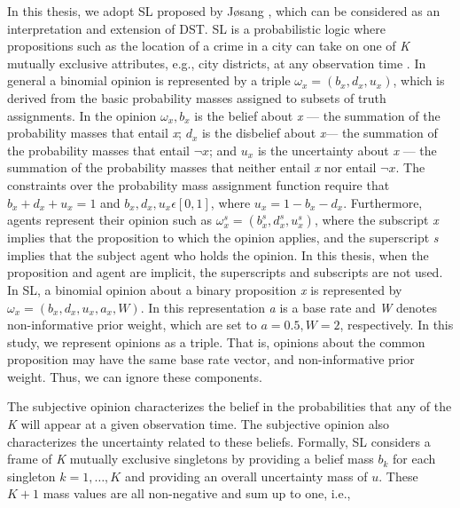 \documentclass[a4,12pt]{ozu-thesis}
\begin{document}
In this thesis, we adopt SL proposed by Jøsang \cite{josang2011subjective}, which can be considered as an interpretation and extension of DST. SL is a probabilistic logic where propositions such as the location of a crime in a city can take on one of \textit{K} mutually exclusive attributes, e.g., city districts, at any observation time \cite{josang2001logic, josang2011subjective}. In general a binomial opinion is represented by a triple $\omega _{x} = \left ( b_{x}, d_{x}, u_{x}\right )$, which is derived from the basic probability masses assigned to subsets of truth assignments. In the opinion $\omega _{x}, b_{x}$ is the belief about \textit{x} — the summation of the probability masses that entail \textit{x}; $ d_{x}$ is the disbelief about \textit{x}— the summation of the probability masses that entail $\neg x$; and $u_{x}$ is the uncertainty about \textit{x} — the summation of the probability masses that neither entail \textit{x} nor entail $\neg x$. The constraints over the probability mass assignment function require that $b_{x} + d_{x} + u_{x} = 1$ and $b_{x}, d_{x}, u_{x} \epsilon \left [ 0, 1 \right ]$, where $u_{x} = 1 - b_{x} - d_{x}$.  Furthermore, agents represent their opinion such as $\omega _{x}^{s} = \left ( b_{x}^{s}, d_{x}^{s}, u_{x}^{s}  \right )$, where the subscript \textit{x} implies that the proposition to which the opinion applies, and the superscript \textit{s} implies that the subject agent who holds the opinion. In this thesis, when the proposition and agent are implicit, the superscripts and subscripts are not used. In SL, a binomial opinion about a binary proposition \textit{x} is represented by $\omega _{x} = \left ( b_{x}, d_{x}, u_{x}, a_{x}, W \right )$. In this representation \textit{a} is a base rate and \textit{W} denotes non-informative prior weight, which are set to $a = 0.5, W = 2$, respectively. In this study, we represent opinions as a triple. That is, opinions about the common proposition may have the same base rate vector, and non-informative prior weight. Thus, we can ignore these components. 


 The subjective opinion characterizes the belief in the probabilities that any of the \textit{K} will appear at a given observation time. The subjective opinion also characterizes the uncertainty related to these beliefs. Formally, SL considers a frame of \textit{K} mutually exclusive singletons by providing a belief mass  $ \mathit{b_{k}}$ for each singleton  $ \mathit{k} = 1,\ldots,K $  and providing an overall uncertainty mass of  $\mathit{u}$. These  $ \mathit{K}+1 $   mass values are all non-negative and sum up to one, i.e.,
 
\end{document}
